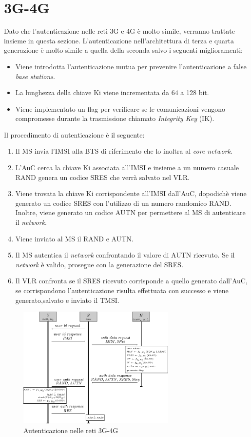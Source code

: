 \section{3G-4G}
Dato che l'autenticazione nelle reti 3G e 4G è molto simile, verranno trattate insieme in questa sezione.
L'autenticazione nell'architettura di terza e quarta generazione è molto simile a quella della seconda salvo i seguenti miglioramenti:
\begin{itemize}
    \item Viene introdotta l'autenticazione mutua per prevenire l'autenticazione a false \textit{base stations}.
    \item La lunghezza della chiave Ki viene incrementata da 64 a 128 bit.
    \item Viene implementato un flag per verificare se le comunicazioni vengono compromesse durante la trasmissione chiamato \textit{Integrity Key} (IK).
\end{itemize}
Il procedimento di autenticazione è il seguente\cite{4g-auth}:
\begin{enumerate}
    \item Il MS invia l'IMSI alla BTS di riferimento che lo inoltra al \textit{core network}.
    \item L'AuC cerca la chiave Ki associata all'IMSI e insieme a un numero casuale RAND genera un codice SRES che verrà
    salvato nel VLR.
    \item Viene trovata la chiave Ki corrispondente all'IMSI dall'AuC, dopodichè viene generato un codice SRES con l'utilizzo di un numero randomico RAND.
    Inoltre, viene generato un codice AUTN per permettere al MS di autenticare il \textit{network}.
    \item Viene inviato al MS il RAND e AUTN.
    \item Il MS autentica il \textit{network} confrontando il valore di AUTN ricevuto. Se il \textit{network} è valido, prosegue con la generazione del SRES.
    \item Il VLR confronta se il SRES ricevuto corrisponde a quello generato dall'AuC, se corrispondono l'autenticazione risulta
    effettuata con successo e viene generato,salvato e inviato il TMSI.
\end{enumerate}
\begin{figure}[h]
    \centering
    \includegraphics[width=0.7\textwidth]{images/auth-3g.png}
    \caption{Autenticazione nelle reti 3G-4G}
\end{figure}

